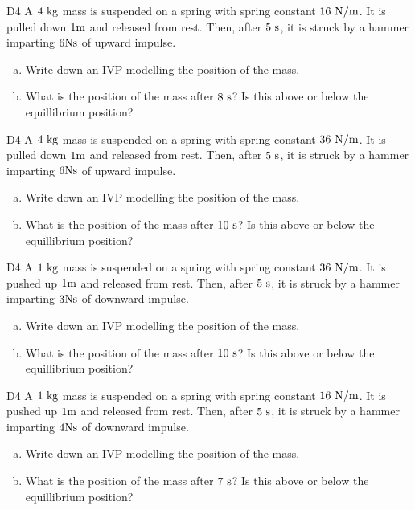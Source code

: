 \begin{problem}{D4}
A \(4\ {\rm kg}\) mass is suspended on a spring with spring constant \(16\ {\rm N/m}\).  It is pulled down \(1 {\rm m}\) and released from rest.  Then, after \(5\ {\rm s}\), it is struck by a hammer imparting \(6 {\rm Ns}\) of upward impulse.
\begin{enumerate}[(a)]
\item Write down an IVP modelling the position of the mass.
\item What is the position of the mass after \(8 \ {\rm s}\)?  Is this above or below the equillibrium position?
\end{enumerate}
\end{problem}


\begin{problem}{D4}
A \(4\ {\rm kg}\) mass is suspended on a spring with spring constant \(36\ {\rm N/m}\).  It is pulled down \(1 {\rm m}\) and released from rest.  Then, after \(5\ {\rm s}\), it is struck by a hammer imparting \(6 {\rm Ns}\) of upward impulse.
\begin{enumerate}[(a)]
\item Write down an IVP modelling the position of the mass.
\item What is the position of the mass after \(10 \ {\rm s}\)?  Is this above or below the equillibrium position?
\end{enumerate}
\end{problem}

\begin{problem}{D4}
A \(1\ {\rm kg}\) mass is suspended on a spring with spring constant \(36\ {\rm N/m}\).  It is pushed up \(1 {\rm m}\) and released from rest.  Then, after \(5\ {\rm s}\), it is struck by a hammer imparting \(3 {\rm Ns}\) of downward impulse.
\begin{enumerate}[(a)]
\item Write down an IVP modelling the position of the mass.
\item What is the position of the mass after \(10 \ {\rm s}\)?  Is this above or below the equillibrium position?
\end{enumerate}
\end{problem}

\begin{problem}{D4}
A \(1\ {\rm kg}\) mass is suspended on a spring with spring constant \(16\ {\rm N/m}\).  It is pushed up \(1 {\rm m}\) and released from rest.  Then, after \(5\ {\rm s}\), it is struck by a hammer imparting \(4 {\rm Ns}\) of downward impulse.
\begin{enumerate}[(a)]
\item Write down an IVP modelling the position of the mass.
\item What is the position of the mass after \(7 \ {\rm s}\)?  Is this above or below the equillibrium position?
\end{enumerate}
\end{problem}

